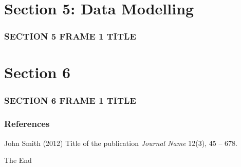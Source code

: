 \documentclass{beamer}
\begin{document}
\section{Section 5: Data Modelling}
\begin{frame}
\frametitle{SECTION 5 FRAME 1 TITLE}
\end{frame}




\section{Section 6}
\begin{frame}
\frametitle{SECTION 6 FRAME 1 TITLE}
\end{frame}




\begin{frame}
\frametitle{References}
\footnotesize{
\begin{thebibliography}{99} %
 John Smith (2012)
\newblock Title of the publication
\newblock \emph{Journal Name} 12(3), 45 -- 678.
\end{thebibliography}
}
\end{frame}


\begin{frame}
\Huge{\centerline{The End}}
\end{frame}

\end{document}
